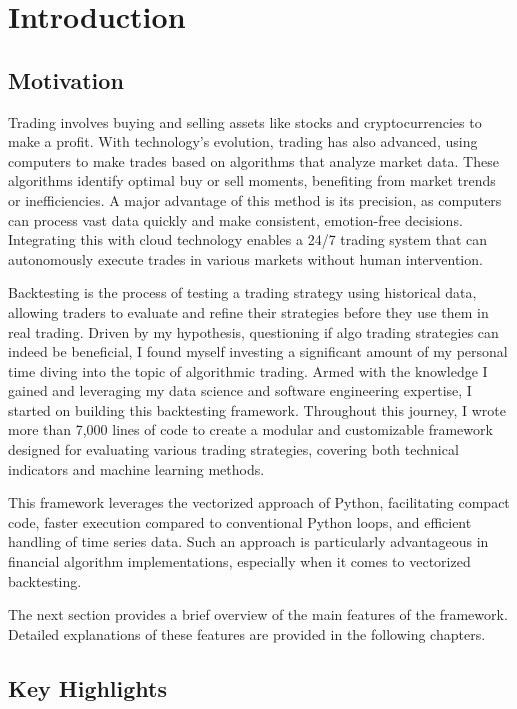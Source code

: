 \chapter{Introduction}

\section{Motivation}
Trading involves buying and selling assets like stocks and cryptocurrencies to make a profit. With technology's evolution, trading has also advanced, using computers to make trades based on algorithms that analyze market data. These algorithms identify optimal buy or sell moments, benefiting from market trends or inefficiencies. A major advantage of this method is its precision, as computers can process vast data quickly and make consistent, emotion-free decisions. Integrating this with cloud technology enables a 24/7 trading system that can autonomously execute trades in various markets without human intervention.

Backtesting is the process of testing a trading strategy using historical data, allowing traders to evaluate and refine their strategies before they use them in real trading. Driven by my hypothesis, questioning if algo trading strategies can indeed be beneficial, I found myself investing a significant amount of my personal time diving into the topic of algorithmic trading. Armed with the knowledge I gained and leveraging my data science and software engineering expertise, I started on building this backtesting framework. Throughout this journey, I wrote more than 7,000 lines of code to create a modular and customizable framework designed for evaluating various trading strategies, covering both technical indicators and machine learning methods.

This framework leverages the vectorized approach of Python, facilitating compact code, faster execution compared to conventional Python loops, and efficient handling of time series data. Such an approach is particularly advantageous in financial algorithm implementations, especially when it comes to vectorized backtesting.

The next section provides a brief overview of the main features of the framework. Detailed explanations of these features are provided in the following chapters.


\section{Key Highlights}

